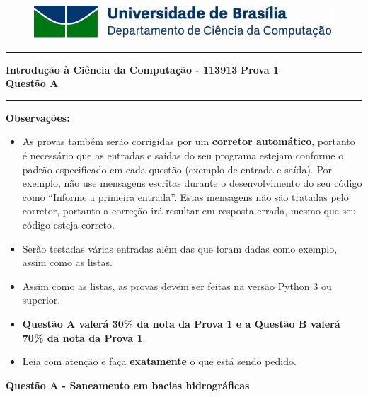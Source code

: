 \documentclass[a4paper, 12pt]{article}
\begin{document}
\begin{figure}[H]
	\includegraphics[scale=0.9]{UnB_CiC_Logo.jpg}
\end{figure}
\noindent\rule{\textwidth}{0.4pt}
\begin{center}
	\textbf{{\Large Introdução à Ciência da Computação - 113913}} \newline \newline
	\textbf{{\large Prova 1} \\
	\vspace{9pt}
	{\large Questão A}} \\
	\noindent\rule{\textwidth}{0.4pt}
	\newline
\end{center}

\textbf{{\large Observações:}}
\begin{itemize}
	\item As provas também serão corrigidas por um \textbf{corretor automático}, portanto é necessário que as entradas e saídas do seu programa estejam conforme o padrão especificado em cada questão (exemplo de entrada e saída). Por exemplo, não use mensagens escritas durante o desenvolvimento do seu código como “Informe a primeira entrada”. Estas mensagens não são tratadas pelo corretor, portanto a correção irá resultar em resposta errada, mesmo que seu código esteja correto.
	\item Serão testadas várias entradas além das que foram dadas como exemplo, assim como as listas.
	\item Assim como as listas, as provas devem ser feitas na versão Python 3 ou superior.
	\item \textbf{Questão A valerá 30\% da nota da Prova 1 e a Questão B valerá 70\% da nota da Prova 1}.
	\item Leia com atenção e faça \textbf{exatamente} o que está sendo pedido.
\end{itemize}
\newpage %
\begin{center}
\textbf{{\Large Questão A - Saneamento em bacias hidrográficas}}
\end{center}
\vspace{5pt}
\end{document}
